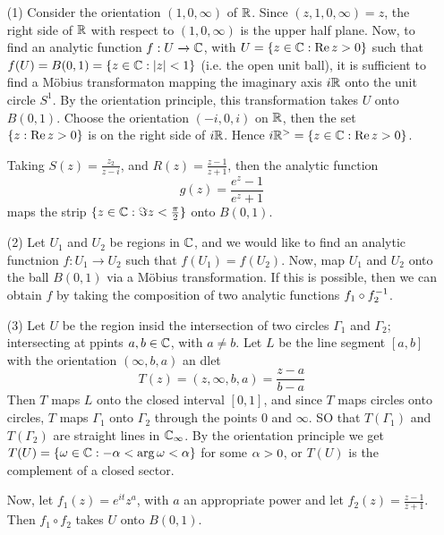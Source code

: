 \begin{example}\label{example_3.11}
    \begin{enumerate}
        \item[(1)] Consider the orientation $(1,0,\infty)$ of $\mathbb{R}$. Since
            $(z,1,0,\infty)=z$, the right side of $\mathbb{R}$ with respect to
            $(1,0,\infty)$ is the upper half plane. Now, to find an analytic
            function $f:U \xrightarrow{} \mathbb{C}$, with $U=\{z \in \mathbb{C} : \operatorname{Re}{z}>0\}$
            such that $f(U)=B(0,1)=\{z \in \mathbb{C} : |z|<1\}$ (i.e. the open unit
            ball), it is sufficient to find a M\"obius transformaton mapping the
            imaginary axis $i\mathbb{R}$ onto the unit circle $S^1$. By the orientation
            principle, this transformation takes  $U$ onto  $B(0,1)$. Choose the
            orientation $(-i,0,i)$ on $\mathbb{R}$, then the set $\{z:\operatorname{Re}{z}>0\}$ is
            on the right side of $i\mathbb{R}$. Hence $i\mathbb{R}^>=\{z \in \mathbb{C} : \operatorname{Re}{z}>0\}$.

            Taking $S(z)=\frac{z_2}{z-i}$, and $R(z)=\frac{z-1}{z+1}$, then the
            analytic function
            \begin{equation*}
                g(z)=\frac{e^z-1}{e^z+1}
            \end{equation*}
            maps the strip $\{z \in \mathbb{C} : \Im{z}<\frac{\pi}{2}\}$ onto $B(0,1)$.

        \item[(2)] Let $U_1$ and $U_2$ be regions in $\mathbb{C}$, and we would like to
            find an analytic functnion $f:U_1 \xrightarrow{} U_2$ such that
            $f(U_1)=f(U_2)$. Now, map $U_1$ and $U_2$ onto the ball $B(0,1)$ via
            a M\"obius transformation. If this is possible, then we can obtain
            $f$ by taking the composition of two analytic functions  $f_1 \circ
            f_2^{-1}$.

        \item[(3)] Let $U$ be the region insid the intersection of two circles
            $\Gamma_1$ and $\Gamma_2$; intersecting at ppints $a,b \in \mathbb{C}$, with
             $a \neq b$. Let  $L$ be the line segment $[a,b]$ with the
             orientation $(\infty,b,a)$ an dlet
             \begin{equation*}
                 T(z)=(z,\infty,b,a)=\frac{z-a}{b-a}
             \end{equation*}
             Then $T$ maps  $L$ onto the closed interval $[0,1]$, and since $T$
             maps circles onto circles, $T$ maps $\Gamma_1$ onto $\Gamma_2$
             through the points $0$ and  $\infty$. SO that $T(\Gamma_1)$ and
             $T(\Gamma_2)$ are straight lines in $\mathbb{C}_\infty$. By the orientation
             principle we get  $T(U)=\{\omega \in \mathbb{C} : -\alpha<\arg{\omega}<\alpha\}$ for some
             $\alpha>0$, or  $T(U)$ is the complement of a closed sector.

             Now, let $f_1(z)=e^{it}z^a$, with $a$ an appropriate power and let
             $f_2(z)=\frac{z-1}{z+1}$. Then $f_1 \circ f_2$ takes $U$ onto
             $B(0,1)$.
    \end{enumerate}
\end{example}
